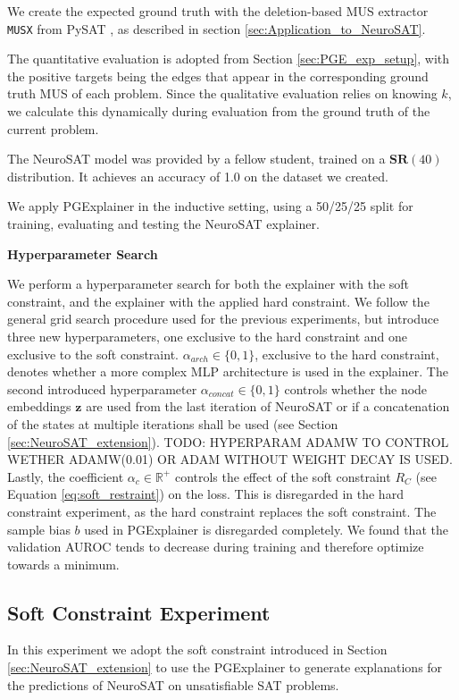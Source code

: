 We create the expected ground truth with the deletion-based MUS extractor \verb|MUSX| from PySAT \cite{imms-sat18}, as described in section \ref{sec:Application_to_NeuroSAT}.

The quantitative evaluation is adopted from Section \ref{sec:PGE_exp_setup}, with the positive targets being the edges that appear in the corresponding ground truth MUS of each problem. Since the qualitative evaluation relies on knowing $k$, we calculate this dynamically during evaluation from the ground truth of the current problem.

The NeuroSAT model was provided by a fellow student, trained on a $\textbf{SR}(40)$ distribution. It achieves an accuracy of 1.0 on the dataset we created.

We apply PGExplainer in the inductive setting, using a 50/25/25 split for training, evaluating and testing the NeuroSAT explainer. \bigskip

\textbf{Hyperparameter Search}\par
We perform a hyperparameter search for both the explainer with the soft constraint, and the explainer with the applied hard constraint. We follow the general grid search procedure used for the previous experiments, but introduce three new hyperparameters, one exclusive to the hard constraint and one exclusive to the soft constraint. $\alpha_{arch} \in \{0,1\}$, exclusive to the hard constraint, denotes whether a more complex MLP architecture is used in the explainer. The second introduced hyperparameter $\alpha_{concat} \in \{0,1\}$ controls whether the node embeddings $\mathbf{z}$ are used from the last iteration of NeuroSAT or if a concatenation of the states at multiple iterations shall be used (see Section \ref{sec:NeuroSAT_extension}). TODO: HYPERPARAM ADAMW TO CONTROL WETHER ADAMW(0.01) OR ADAM WITHOUT WEIGHT DECAY IS USED. Lastly, the coefficient $\alpha_{c} \in \mathbb{R}^+$ controls the effect of the soft constraint $R_C$ (see Equation \ref{eq:soft_restraint}) on the loss. This is disregarded in the hard constraint experiment, as the hard constraint replaces the soft constraint. The sample bias $b$ used in PGExplainer is disregarded completely. We found that the validation AUROC tends to decrease during training and therefore optimize towards a minimum.


\subsection{Soft Constraint Experiment}
In this experiment we adopt the soft constraint introduced in Section \ref{sec:NeuroSAT_extension} to use the PGExplainer to generate explanations for the predictions of NeuroSAT on unsatisfiable SAT problems. \bigskip

